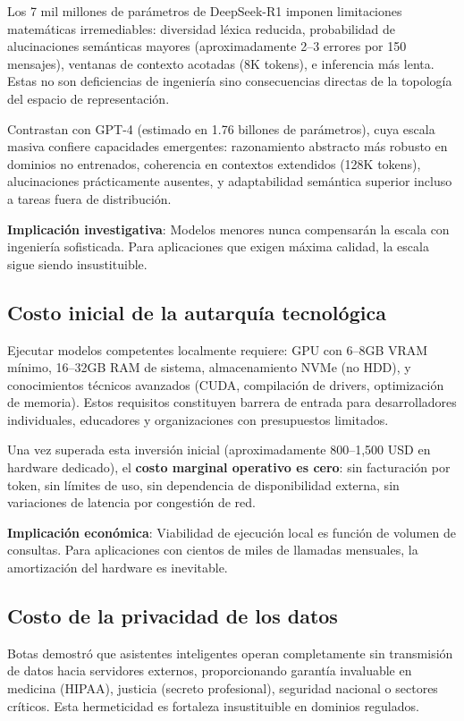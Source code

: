 \documentclass[12pt,a4paper]{report}
\numberwithin{figure}{section}
\begin{document}
Los 7 mil millones de parámetros de DeepSeek-R1 imponen limitaciones matemáticas irremediables: diversidad léxica reducida, probabilidad de alucinaciones semánticas mayores (aproximadamente 2--3 errores por 150 mensajes), ventanas de contexto acotadas (8K tokens), e inferencia más lenta. Estas no son deficiencias de ingeniería sino consecuencias directas de la topología del espacio de representación.

Contrastan con GPT-4 (estimado en 1.76 billones de parámetros), cuya escala masiva confiere capacidades emergentes: razonamiento abstracto más robusto en dominios no entrenados, coherencia en contextos extendidos (128K tokens), alucinaciones prácticamente ausentes, y adaptabilidad semántica superior incluso a tareas fuera de distribución.

\textbf{Implicación investigativa}: Modelos menores nunca compensarán la escala con ingeniería sofisticada. Para aplicaciones que exigen máxima calidad, la escala sigue siendo insustituible.

\subsection{Costo inicial de la autarquía tecnológica}

Ejecutar modelos competentes localmente requiere: GPU con 6--8GB VRAM mínimo, 16--32GB RAM de sistema, almacenamiento NVMe (no HDD), y conocimientos técnicos avanzados (CUDA, compilación de drivers, optimización de memoria). Estos requisitos constituyen barrera de entrada para desarrolladores individuales, educadores y organizaciones con presupuestos limitados.

Una vez superada esta inversión inicial (aproximadamente 800--1,500 USD en hardware dedicado), el \textbf{costo marginal operativo es cero}: sin facturación por token, sin límites de uso, sin dependencia de disponibilidad externa, sin variaciones de latencia por congestión de red.

\textbf{Implicación económica}: Viabilidad de ejecución local es función de volumen de consultas. Para aplicaciones con cientos de miles de llamadas mensuales, la amortización del hardware es inevitable.

\subsection{Costo de la privacidad de los datos}

Botas demostró que asistentes inteligentes operan completamente sin transmisión de datos hacia servidores externos, proporcionando garantía invaluable en medicina (HIPAA), justicia (secreto profesional), seguridad nacional o sectores críticos. Esta hermeticidad es fortaleza insustituible en dominios regulados.
\end{document}
